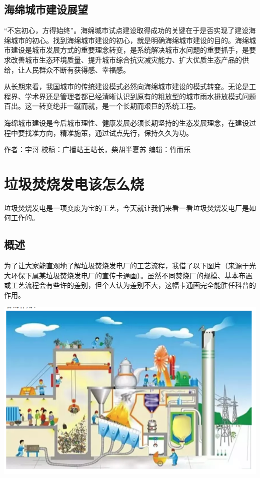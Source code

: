 \documentclass[]{book}
\begin{document}
\hypertarget{ux6d77ux7ef5ux57ceux5e02ux5efaux8bbeux5c55ux671b}{%
\subsection{海绵城市建设展望}\label{ux6d77ux7ef5ux57ceux5e02ux5efaux8bbeux5c55ux671b}}

``不忘初心，方得始终''。海绵城市试点建设取得成功的关键在于是否实现了建设海绵城市的初心。找到海绵城市建设的初心，就是明确海绵城市建设的目的。海绵城市建设是城市发展方式的重要理念转变，是系统解决城市水问题的重要抓手，是要求改善城市生态环境质量、提升城市综合抗灾减灾能力、扩大优质生态产品的供给，让人民群众不断有获得感、幸福感。

从长期来看，我国城市的传统建设模式必然向海绵城市建设的模式转变。无论是工程界、学术界还是管理者都已经清晰认识到原有的粗放型的城市雨水排放模式问题百出。这一转变绝非一蹴而就，是一个长期而艰巨的系统工程。

海绵城市建设是今后城市理性、健康发展必须长期坚持的生态发展理念，在建设过程中要找准方向，精准施策，通过试点先行，保持久久为功。

作者：宇哥
校稿：广播站王站长，柴胡半夏苏
编辑：竹而乐

\hypertarget{ux5783ux573eux711aux70e7ux53d1ux7535ux8be5ux600eux4e48ux70e7}{%
\section{垃圾焚烧发电该怎么烧}\label{ux5783ux573eux711aux70e7ux53d1ux7535ux8be5ux600eux4e48ux70e7}}

垃圾焚烧发电是一项变废为宝的工艺，今天就让我们来看一看垃圾焚烧发电厂是如何工作的。

\hypertarget{ux6982ux8ff0}{%
\subsection{概述}\label{ux6982ux8ff0}}

为了让大家能直观地了解垃圾焚烧发电厂的工艺流程，我借了以下图片（来源于光大环保下属某垃圾焚烧发电厂的宣传卡通画）。虽然不同焚烧厂的规模、基本布置或工艺流程会有些许的差别，但个人认为差别不大，这幅卡通画完全能胜任科普的作用。

\includegraphics[width=8.33in]{images/ljfs1}
\end{document}
